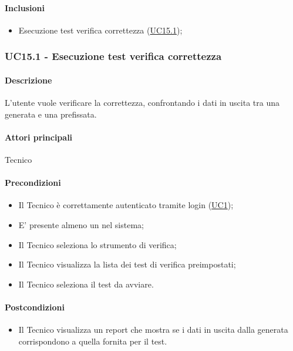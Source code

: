 \paragraph*{Inclusioni}
\begin{itemize}
  \item Esecuzione test verifica correttezza (\hyperref[UC15point1]{UC15.1});
\end{itemize}


\subsubsection{UC15.1 - Esecuzione test verifica correttezza}\label{UC15point1}
\paragraph*{Descrizione}
L’utente vuole verificare la correttezza, confrontando i dati in uscita tra una  generata e una prefissata.

\paragraph*{Attori principali}
Tecnico

\paragraph*{Precondizioni}
\begin{itemize}
  \item Il Tecnico è correttamente autenticato tramite login (\hyperref[UC1]{UC1});
  \item E’ presente almeno un nel sistema;
  \item Il Tecnico seleziona lo strumento di verifica;
  \item Il Tecnico visualizza la lista dei test di verifica preimpostati; %
  \item Il Tecnico seleziona il test da avviare. %
\end{itemize}

\paragraph*{Postcondizioni}
\begin{itemize}
  \item Il Tecnico visualizza un report che mostra se i dati in uscita dalla  generata corrispondono a quella fornita per il test.
\end{itemize}

